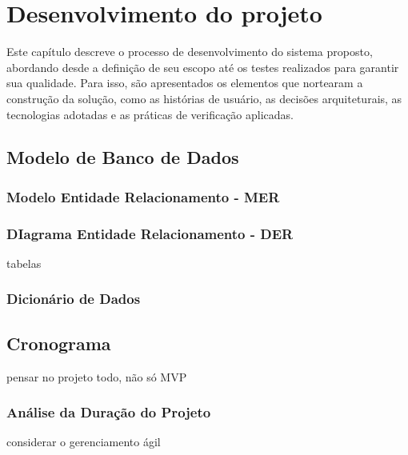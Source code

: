 	\chapter{Desenvolvimento do projeto}

	Este capítulo descreve o processo de desenvolvimento do sistema proposto, abordando desde a definição de seu escopo até os testes realizados para garantir sua qualidade. Para isso, são apresentados os elementos que nortearam a construção da solução, como as histórias de usuário, as decisões arquiteturais, as tecnologias adotadas e as práticas de verificação aplicadas.
	
	
	
	
	
	
	
	
	
	\section{Modelo de Banco de Dados}
	\subsection{Modelo Entidade Relacionamento - MER}
	\subsection{DIagrama Entidade Relacionamento - DER}
	tabelas
	\subsection{Dicionário de Dados}
	\section{Cronograma}
	pensar no projeto todo, não só MVP
	\subsection{Análise da Duração do Projeto}
	considerar o gerenciamento ágil